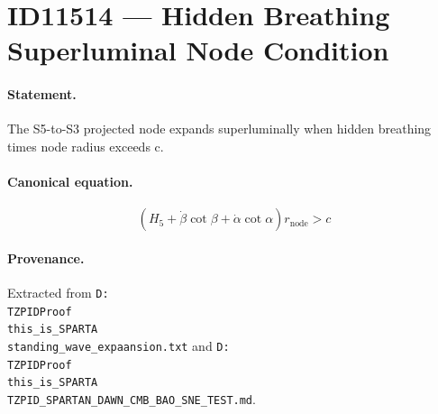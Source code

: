 \section*{ID11514 --- Hidden Breathing Superluminal Node Condition}

\paragraph{Statement.}
The S5-to-S3 projected node expands superluminally when hidden breathing times node radius exceeds c.

\paragraph{Canonical equation.}
\[
\left(H_5+\dot\beta\cot\beta+\dot\alpha\cot\alpha\right)r_{\mathrm{node}}>c
\]

\paragraph{Provenance.}
Extracted from \texttt{D:\\TZPIDProof\\this\_is\_SPARTA\\standing\_wave\_expaansion.txt} and \texttt{D:\\TZPIDProof\\this\_is\_SPARTA\\TZPID\_SPARTAN\_DAWN\_CMB\_BAO\_SNE\_TEST.md}.
